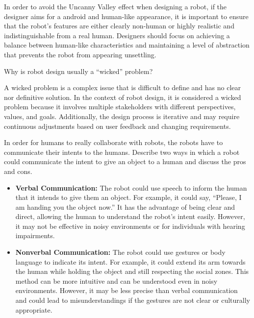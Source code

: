 \begin{ejercicio}
    In order to avoid the Uncanny Valley effect when designing a robot, if the designer aims for a android and human-like appearance, it is important to ensure that the robot's features are either clearly non-human or highly realistic and indistinguishable from a real human. Designers should focus on achieving a balance between human-like characteristics and maintaining a level of abstraction that prevents the robot from appearing unsettling.
\end{ejercicio}

\begin{ejercicio}
    Why is robot design usually a ``wicked'' problem?

    A wicked problem is a complex issue that is difficult to define and has no clear nor definitive solution. In the context of robot design, it is considered a wicked problem because it involves multiple stakeholders with different perspectives, values, and goals. Additionally, the design process is iterative and may require continuous adjustments based on user feedback and changing requirements.
\end{ejercicio}


\begin{ejercicio}
    In order for humans to really collaborate with robots, the robots have to communicate their intents to the humans. Describe two ways in which a robot could communicate the intent to give an object to a human and discuss the pros and cons.
    \begin{itemize}
        \item \textbf{Verbal Communication:} The robot could use speech to inform the human that it intends to give them an object. For example, it could say, ``Please, I am handing you the object now.'' It has the advantage of being clear and direct, allowing the human to understand the robot's intent easily. However, it may not be effective in noisy environments or for individuals with hearing impairments.
        \item \textbf{Nonverbal Communication:} The robot could use gestures or body language to indicate its intent. For example, it could extend its arm towards the human while holding the object and still respecting the social zones. This method can be more intuitive and can be understood even in noisy environments. However, it may be less precise than verbal communication and could lead to misunderstandings if the gestures are not clear or culturally appropriate.
    \end{itemize}
\end{ejercicio}

